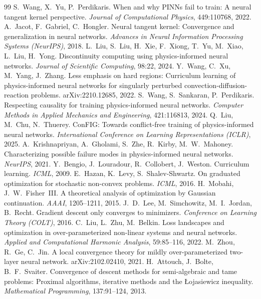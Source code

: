 \documentclass[11pt]{article}
\numberwithin{equation}{section}
\begin{document}
\begin{thebibliography}{99}
 S.~Wang, X.~Yu, P.~Perdikaris. When and why PINNs fail to train: A neural tangent kernel perspective. \emph{Journal of Computational Physics}, 449:110768, 2022.
 A.~Jacot, F.~Gabriel, C.~Hongler. Neural tangent kernel: Convergence and generalization in neural networks. \emph{Advances in Neural Information Processing Systems (NeurIPS)}, 2018.
 L.~Liu, S.~Liu, H.~Xie, F.~Xiong, T.~Yu, M.~Xiao, L.~Liu, H.~Yong. Discontinuity computing using physics-informed neural networks. \emph{Journal of Scientific Computing}, 98:22, 2024.
 Y.~Wang, C.~Xu, M.~Yang, J.~Zhang. Less emphasis on hard regions: Curriculum learning of physics-informed neural networks for singularly perturbed convection-diffusion-reaction problems. arXiv:2210.12685, 2022.
 S.~Wang, S.~Sankaran, P.~Perdikaris. Respecting causality for training physics-informed neural networks. \emph{Computer Methods in Applied Mechanics and Engineering}, 421:116813, 2024.
 Q.~Liu, M.~Chu, N.~Thuerey. ConFIG: Towards conflict-free training of physics-informed neural networks. \emph{International Conference on Learning Representations (ICLR)}, 2025.
 A.~Krishnapriyan, A.~Gholami, S.~Zhe, R.~Kirby, M.~W.~Mahoney. Characterizing possible failure modes in physics-informed neural networks. \emph{NeurIPS}, 2021.
 Y.~Bengio, J.~Louradour, R.~Collobert, J.~Weston. Curriculum learning. \emph{ICML}, 2009.
 E.~Hazan, K.~Levy, S.~Shalev-Shwartz. On graduated optimization for stochastic non-convex problems. \emph{ICML}, 2016.
 H.~Mobahi, J.~W.~Fisher~III. A theoretical analysis of optimization by Gaussian continuation. \emph{AAAI}, 1205--1211, 2015.
 J.~D.~Lee, M.~Simchowitz, M.~I.~Jordan, B.~Recht. Gradient descent only converges to minimizers. \emph{Conference on Learning Theory (COLT)}, 2016.
 C.~Liu, L.~Zhu, M.~Belkin. Loss landscapes and optimization in over-parameterized non-linear systems and neural networks. \emph{Applied and Computational Harmonic Analysis}, 59:85--116, 2022.
 M.~Zhou, R.~Ge, C.~Jin. A local convergence theory for mildly over-parameterized two-layer neural network. arXiv:2102.02410, 2021.
 H.~Attouch, J.~Bolte, B.~F.~Svaiter. Convergence of descent methods for semi-algebraic and tame problems: Proximal algorithms, iterative methods and the {\L}ojasiewicz inequality. \emph{Mathematical Programming}, 137:91--124, 2013.

\end{thebibliography}
\end{document}
